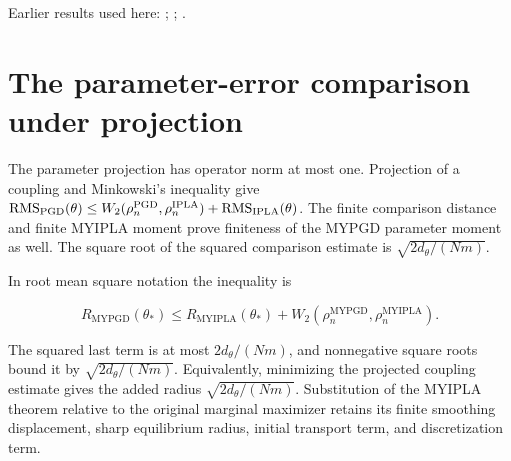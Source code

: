\documentclass[11pt,a4paper]{article}
\begin{document}
Earlier results used here: \cite[Section~3.17.3]{LangevinLean2026ULASC}; \cite[Section~3.17.4]{LangevinLean2026ULASC}; \cite[Section~3.1.1]{LangevinLean2026IPLA}.

\section{\texorpdfstring{The parameter-error comparison under projection}{The parameter-error comparison under projection}}


The parameter projection has operator norm at most one. Projection of a coupling and Minkowski’s inequality give \(\operatorname{RMS}_{\rm PGD}(\theta)\le W_2(\rho_n^{\rm PGD},\rho_n^{\rm IPLA})+\operatorname{RMS}_{\rm IPLA}(\theta)\). The finite comparison distance and finite MYIPLA moment prove finiteness of the MYPGD parameter moment as well. The square root of the squared comparison estimate is \(\sqrt{2d_\theta/(Nm)}\).



In root mean square notation the inequality is

\[R_{\mathrm{MYPGD}}(\theta_*)\le R_{\mathrm{MYIPLA}}(\theta_*)+W_2(\rho_n^{\mathrm{MYPGD}},\rho_n^{\mathrm{MYIPLA}}).\]

The squared last term is at most \(2d_\theta/(Nm)\), and nonnegative square roots bound it by \(\sqrt{2d_\theta/(Nm)}\). Equivalently, minimizing the projected coupling estimate gives the added radius \(\sqrt{2d_\theta/(Nm)}\). Substitution of the MYIPLA theorem relative to the original marginal maximizer retains its finite smoothing displacement, sharp equilibrium radius, initial transport term, and discretization term.
\end{document}

